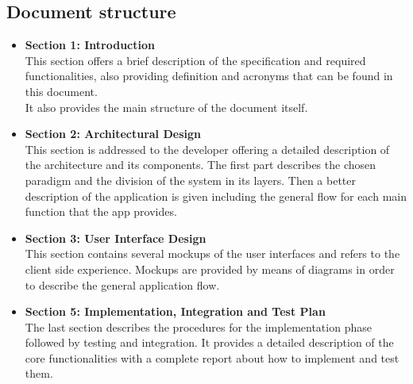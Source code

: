 \subsection{Document structure}
\begin{itemize}
    \item \textbf{Section 1: Introduction}\\
    This section offers a brief description of the specification and required functionalities, also providing definition and acronyms that can be found in this document.\\
    It also provides the main structure of the document itself.
    
    \item \textbf{Section 2: Architectural Design}\\
    This section is addressed to the developer offering a detailed description of the architecture and its components. The first part describes the chosen paradigm and the division of the system in its layers. Then a better description of the application is given including the general flow for each main function that the app provides.
    
    \item \textbf{Section 3: User Interface Design}\\
    This section contains several mockups of the user interfaces and refers to the client side experience. Mockups are provided by means of diagrams in order to describe the general application flow.
    
    
    \item \textbf{Section 5: Implementation, Integration and Test Plan}\\
    The last section describes the procedures for the implementation phase followed by testing and integration. It provides a detailed description of the core functionalities with a complete report about how to implement and test them.
    
\end{itemize}